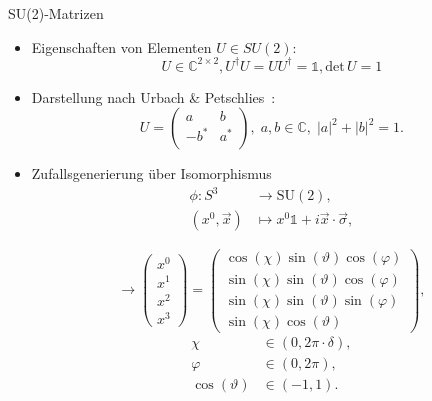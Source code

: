 \documentclass[ngerman]{beamer}
\begin{document}
\begin{frame}{SU(2)-Matrizen}
\begin{itemize}
	\item Eigenschaften von Elementen $U \in SU(2)$:
	\[
	U \in \mathds{C}^{2 \times 2}, U^\dag U = U U^\dag = \mathds{1}, \text{det} \, U = 1
	\]
	\item Darstellung nach Urbach \& Petschlies~\cite{urbachCPscript}:
	\[
	U =
	\begin{pmatrix}
	a    & b   \\
	-b^* & a^* \\
	\end{pmatrix},
	\; a, b \in \mathds{C}, \; |a|^2 + |b|^2 = 1.
	\]
	\item Zufallsgenerierung über Isomorphismus
	\begin{align*}
	\phi: S^3 &\rightarrow \mathrm{SU}(2),\\
	(x^0, \vec{x}) &\mapsto x^0 \mathds{1} + i \vec{x} \cdot \vec{\sigma},
	\end{align*}
	\vspace{-1.4cm}
\begin{multicols}{2}
	\[
	\rightarrow \begin{pmatrix}
	x^0 \\
	x^1 \\
	x^2 \\
	x^3
	\end{pmatrix}
	=
	\begin{pmatrix}
	\cos(\chi) \sin(\vartheta) \cos(\varphi) \\
	\sin(\chi) \sin(\vartheta) \cos(\varphi) \\
	\sin(\chi) \sin(\vartheta) \sin(\varphi) \\
	\sin(\chi) \cos(\vartheta)
	\end{pmatrix},
	\]
	\break
	\vspace{-1cm}
	\begin{align*}
	\chi &\in (0, 2 \pi \cdot \delta),\\
	\varphi &\in (0, 2 \pi),\\
	\cos(\vartheta) &\in (-1,1).
	\end{align*}
\end{multicols}
\end{itemize}
\end{frame}
\end{document}

